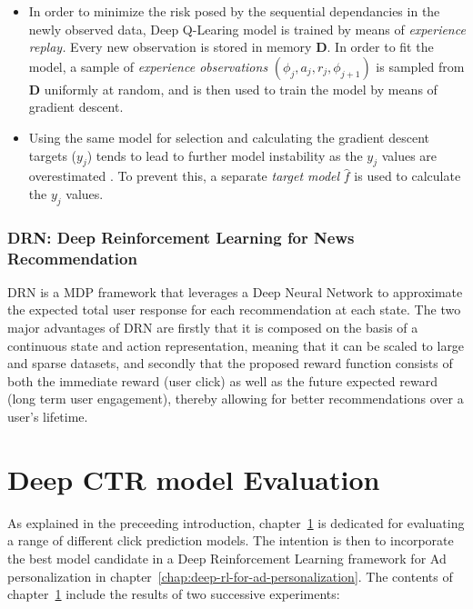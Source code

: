 \documentclass{mldsmsc}
\begin{document}
\begin{itemize}
    \item In order to minimize the risk posed by the sequential dependancies in the newly observed data, Deep Q-Learing
    model is trained by means of \emph{experience replay.} Every new observation is stored in memory $\mathbf{D}$. In order
    to fit the model, a sample of \emph{experience observations}  $(\phi_{j}, a_j, r_j, \phi_{j+1})$ is sampled from $\mathbf{D}$
    uniformly at random, and is then used to train the model by means of gradient descent.
    \item Using the same model for selection and calculating the gradient descent targets ($y_j$) tends to lead to further model instability as the $y_j$ values are overestimated \citep{RefWorks:mnih2015human-level}.
    To prevent this, a separate \emph{target model} $\hat{f}$ is used to calculate the $y_j$ values.
\end{itemize}

\subsection{DRN: Deep Reinforcement Learning for News Recommendation}

DRN \citep{RefWorks:zheng2018drn:} is a MDP framework 
that leverages a Deep Neural Network to approximate the expected total user response for 
each recommendation at each state. The two major advantages of DRN are firstly that it is 
composed on the basis of a continuous state and action representation, meaning that it can 
be scaled to large and sparse datasets, and secondly that the proposed reward function 
consists of both the immediate reward (user click) as well as the future expected reward 
(long term user engagement), thereby allowing for better recommendations over a user’s 
lifetime.

\chapter{Deep CTR model Evaluation}
\label{chap:deep-ctr-model-evaluation}

As explained in the preceeding introduction, chapter~\ref{chap:deep-ctr-model-evaluation} is
dedicated for evaluating a range of different click prediction models. The intention is then to
incorporate the best model candidate in a Deep Reinforcement Learning framework for Ad personalization
in chapter~\ref{chap:deep-rl-for-ad-personalization}. The contents of chapter~\ref{chap:deep-ctr-model-evaluation}
include the results of two successive experiments:
\end{document}
